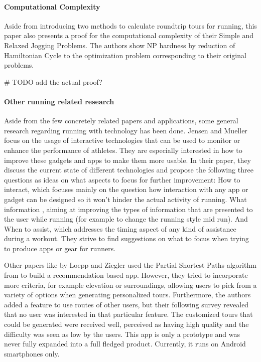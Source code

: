 \paragraph{Computational Complexity}

Aside from introducing two methods to calculate roundtrip tours for running, this paper also presents a proof for the computational complexity of their Simple and Relaxed Jogging Problems.
The authors show NP hardness by reduction of Hamiltonian Cycle to the optimization problem corresponding to their original problems.\cite{gemsa_efficient_2013}

 \# TODO add the actual proof?


\paragraph{Other running related research}
Aside from the few concretely related papers and applications, some general research regarding running with technology has been done.
Jensen and Mueller focus on the usage of interactive technologies that can be used to monitor or enhance the performance of athletes.
They are especially interested in how to improve these gadgets and apps to make them more usable. 
In their paper, they discuss the current state of different technologies and propose the following three questions as ideas on what aspects to focus for further improvement:
\glqq How to interact\grqq , which focuses mainly on the question how interaction with any app or gadget can be designed so it won't hinder the actual activity of running.
\glqq What information \grqq , aiming at improving the types of information that are presented to the user while running (for example to change the running style mid run).
And \glqq When to assist\grqq , which addresses the timing aspect of any kind of assistance during a workout. 
They strive to find suggestions on what to focus when trying to produce apps or gear for runners.

Other papers like \cite{loepp_recommending_nodate} by Loepp and Ziegler used the Partial Shortest Paths algorithm from \cite{gemsa_efficient_2013} to build a recommendation based app.
However, they tried to incorporate more criteria, for example elevation or surroundings, allowing users to pick from a variety of options when generating personalized tours. 
Furthermore, the authors added a feature to use routes of other users, but their following survey revealed that no user was interested in that particular feature.
The customized tours that could be generated were received well, perceived as having high quality and the difficulty was seen as low by the users.
This app is only a prototype and was never fully expanded into a full fledged product.
Currently, it runs on Android smartphones only. 







